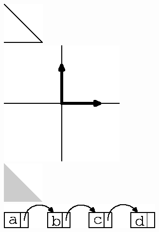 \documentclass{article}
\begin{document}
\includegraphics[width=0.8\linewidth]{test-001-mp}\\
\includegraphics[width=0.8\linewidth]{test-002-mp}\\
\includegraphics[width=0.8\linewidth]{test-003-mp}\\
\includegraphics[width=0.8\linewidth]{test-004-mp}
\end{document}
